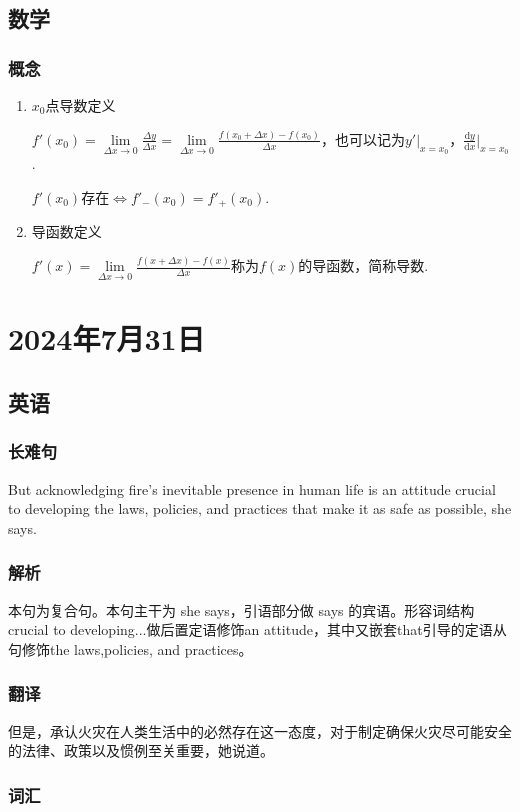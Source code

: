 \documentclass[UTF8]{ctexart}
\begin{document}
\subsection{数学}
\subsubsection{概念}
\begin{enumerate}
      \item $x_0$点导数定义

            ${f}'(x_0)=\lim\limits_{\Delta x \to 0}\frac{\Delta y}{\Delta x}=\lim\limits_{\Delta x \to 0}\frac{f(x_0+\Delta x)-f(x_0)}{\Delta x}$，也可以记为${y}' |_{x=x_0} $，$\frac{\mathrm{d} y}{\mathrm{d} x} |_{x=x_0}$.

            ${f}'(x_0)$存在$\Leftrightarrow{f}'_-(x_0)={f}'_+(x_0)$.
      \item 导函数定义

            ${f}'(x)=\lim\limits_{\Delta x\to 0}\frac{f(x+\Delta x)-f(x)}{\Delta x}$称为$f(x)$的导函数，简称导数.
\end{enumerate}
\section{2024年7月31日}
\subsection{英语}
\subsubsection{长难句}
But acknowledging fire's inevitable presence in human life is an attitude crucial to developing the laws, policies, and practices that make it as safe as possible, she says.
\subsubsection{解析}
本句为复合句。本句主干为 she says，引语部分做 says 的宾语。形容词结构 crucial to developing...做后置定语修饰an attitude，其中又嵌套that引导的定语从句修饰the laws,policies, and practices。
\subsubsection{翻译}
但是，承认火灾在人类生活中的必然存在这一态度，对于制定确保火灾尽可能安全的法律、政策以及惯例至关重要，她说道。
\subsubsection{词汇}
\end{document}
